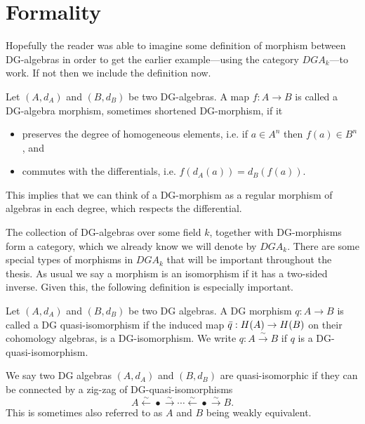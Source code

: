 \section{Formality}
\label{sec:formality}

Hopefully the reader was able to imagine some definition of morphism between DG-algebras in order to get the earlier example---using the category $DGA_k$---to work. If not then we include the definition now. 

\begin{definition}[DG morphism]
    Let $(A, d_A)$ and $(B, d_B)$ be two DG-algebras. A map $f:A\longrightarrow B$ is called a DG-algebra morphism, sometimes shortened DG-morphism, if it
    \begin{itemize}
        \item preserves the degree of homogeneous elements, i.e. if $a\in A^n$ then $f(a)\in B^n$, and
        \item commutes with the differentials, i.e. $f(d_A(a))=d_B(f(a))$. 
    \end{itemize}
\end{definition}

This implies that we can think of a DG-morphism as a regular morphism of algebras in each degree, which respects the differential.

The collection of DG-algebras over some field $k$, together with DG-morphisms form a category, which we already know we will denote by $DGA_k$. There are some special types of morphisms in $DGA_k$ that will be important throughout the thesis. As usual we say a morphism is an isomorphism if it has a two-sided inverse. Given this, the following definition is especially important. 

\begin{definition}
    Let $(A, d_A)$ and $(B, d_B)$ be two DG algebras. A DG morphism $q:A\longrightarrow B$ is called a DG quasi-isomorphism if the induced map $\Bar{q}:H(A)\rightarrow H(B)$ on their cohomology algebras, is a DG-isomorphism. We write $q:A\overset{\sim}\longrightarrow B$ if $q$ is a DG-quasi-isomorphism. 
\end{definition}

\begin{definition}
    We say two DG algebras $(A, d_A)$ and $(B, d_B)$ are quasi-isomorphic if they can be connected by a zig-zag of DG-quasi-isomorphisms 
    \begin{equation*}
        A \overset{\sim}\longleftarrow \bullet \overset{\sim}\longrightarrow \cdots \overset{\sim}\longleftarrow \bullet \overset{\sim}\longrightarrow B .
    \end{equation*}
    This is sometimes also referred to as $A$ and $B$ being weakly equivalent. 
\end{definition}

